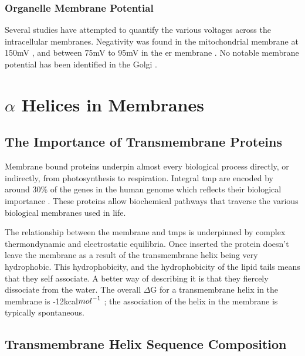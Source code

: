 \subsubsection{Organelle Membrane Potential}

Several studies have attempted to quantify the various voltages across the intracellular membranes. Negativity was found in the mitochondrial membrane at 150mV \cite{Perry2011}, and between 75mV to 95mV in the \gls{er} membrane \cite{Qin2011, Worley1994}. No notable membrane potential has been identified in the Golgi \cite{Schapiro2000}.


\section{$\alpha$ Helices in Membranes }
\subsection{The Importance of Transmembrane Proteins}
Membrane bound proteins underpin almost every biological process directly, or indirectly, from photosynthesis to respiration. Integral \gls{tmp} are encoded by around 30\% of the genes in the human genome which reflects their biological importance \cite{Almen2009}. These proteins allow biochemical pathways that traverse the various biological membranes used in life. %



The relationship between the membrane and \gls{tmp}s is underpinned by complex thermondynamic and electrostatic equilibria. Once inserted the protein doesn't leave the membrane as a result of the transmembrane helix being very hydrophobic. This hydrophobicity, and the hydrophobicity of the lipid tails means that they self associate. A better way of describing it is that they fiercely dissociate from the water. The overall $\Delta$G for a transmembrane helix in the membrane is -12kcal${mol}^{\--1}$ \cite{Cymer2014}; the association of the helix in the membrane is typically spontaneous.

\subsection{Transmembrane Helix Sequence Composition}

